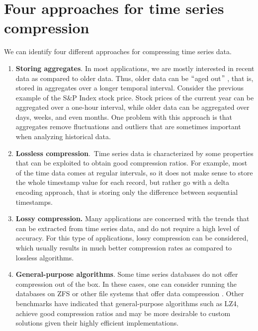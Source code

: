 \section{Four approaches for time series compression}
We can identify four different approaches for compressing time series data.
\begin{enumerate}
	\item \textbf{Storing aggregates}. In most applications, we are mostly interested in recent data as compared to older data. Thus, older data can be $``$aged out$"$ , that is, stored in aggregates over a longer temporal interval. Consider the previous example of the S\&P Index stock price. Stock prices of the current year can be aggregated over a one-hour interval, while older data can be aggregated over days, weeks, and even months. One problem with this approach is that aggregates remove fluctuations and outliers that are sometimes important when analyzing historical data.
	\item \textbf{Lossless compression}.\ Time series data is characterized by some properties that can be exploited to obtain good compression ratios.  For example, most of the time data comes at regular intervals, so it does not make sense to store the whole timestamp value for each record, but rather go with a delta encoding approach, that is storing only the difference between sequential timestamps.
	\item \textbf{Lossy compression. }Many applications are concerned with the trends that can be extracted from time series data, and do not require a high level of accuracy. For this type of applications, lossy compression can be considered, which usually results in much better compression rates as compared to lossless algorithms.
	\item \textbf{General-purpose algorithms}. Some time series databases do not offer compression out of the box. In these cases, one can consider running the databases on ZFS or other file systems that offer data compression \cite{A2019TimescaleDB}. Other benchmarks \cite{Danjou2016Timeseries} have indicated that general-purpose algorithms such as LZ4, achieve good compression ratios and may be more desirable to custom solutions given their highly efficient implementations.
\end{enumerate}